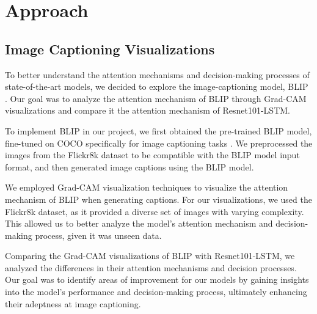 \documentclass[10pt,twocolumn,letterpaper]{article}
\begin{document}
\section{Approach}

\subsection{Image Captioning Visualizations}\label{sec:blipapproach}

To better understand the attention mechanisms and decision-making processes of state-of-the-art models, we decided to explore the image-captioning model, BLIP \cite{blip2022}. Our goal was to analyze the attention mechanism of BLIP through Grad-CAM visualizations and compare it the attention mechanism of Resnet101-LSTM.

To implement BLIP in our project, we first obtained the pre-trained BLIP model, fine-tuned on COCO specifically for image captioning tasks \cite{lavis2022}. We preprocessed the images from the Flickr8k dataset to be compatible with the BLIP model input format, and then generated image captions using the BLIP model.

We employed Grad-CAM visualization techniques to visualize the attention mechanism of BLIP when generating captions. For our visualizations, we used the Flickr8k dataset, as it provided a diverse set of images with varying complexity. This allowed us to better analyze the model's attention mechanism and decision-making process, given it was unseen data.

Comparing the Grad-CAM visualizations of BLIP with Resnet101-LSTM, we analyzed the differences in their attention mechanisms and decision processes. Our goal was to identify areas of improvement for our models by gaining insights into the model's performance and decision-making process, ultimately enhancing their adeptness at image captioning.
\end{document}
